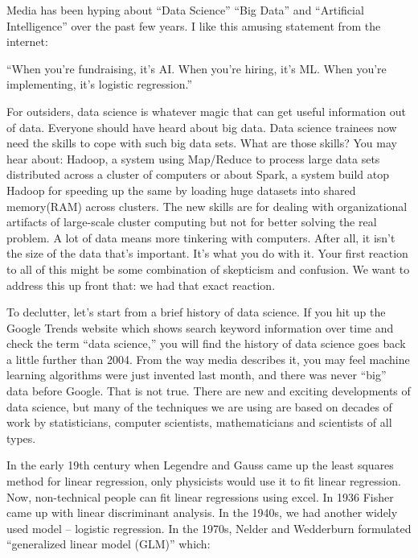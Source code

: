\documentclass[12pt,]{krantz}
\renewenvironment{quote}{\begin{VF}}{\end{VF}}
\theoremstyle{definition}
\theoremstyle{definition}
\theoremstyle{definition}
\theoremstyle{remark}
\begin{document}
Media has been hyping about ``Data Science'' ``Big Data'' and
``Artificial Intelligence'' over the past few years. I like this amusing
statement from the internet:

\begin{quote}
``When you're fundraising, it's AI. When you're hiring, it's ML. When
you're implementing, it's logistic regression.''
\end{quote}

For outsiders, data science is whatever magic that can get useful
information out of data. Everyone should have heard about big data. Data
science trainees now need the skills to cope with such big data sets.
What are those skills? You may hear about: Hadoop, a system using
Map/Reduce to process large data sets distributed across a cluster of
computers or about Spark, a system build atop Hadoop for speeding up the
same by loading huge datasets into shared memory(RAM) across clusters.
The new skills are for dealing with organizational artifacts of
large-scale cluster computing but not for better solving the real
problem. A lot of data means more tinkering with computers. After all,
it isn't the size of the data that's important. It's what you do with
it. Your first reaction to all of this might be some combination of
skepticism and confusion. We want to address this up front that: we had
that exact reaction.

To declutter, let's start from a brief history of data science. If you
hit up the Google Trends website which shows search keyword information
over time and check the term ``data science,'' you will find the history
of data science goes back a little further than 2004. From the way media
describes it, you may feel machine learning algorithms were just
invented last month, and there was never ``big'' data before Google.
That is not true. There are new and exciting developments of data
science, but many of the techniques we are using are based on decades of
work by statisticians, computer scientists, mathematicians and
scientists of all types.

In the early 19th century when Legendre and Gauss came up the least
squares method for linear regression, only physicists would use it to
fit linear regression. Now, non-technical people can fit linear
regressions using excel. In 1936 Fisher came up with linear discriminant
analysis. In the 1940s, we had another widely used model -- logistic
regression. In the 1970s, Nelder and Wedderburn formulated ``generalized
linear model (GLM)'' which:
\end{document}
